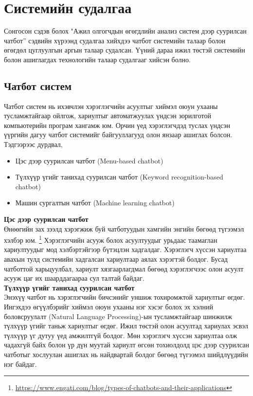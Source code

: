 \section{Системийн судалгаа}
Сонгосон сэдэв болох "Ажил олгогчдын өгөгдлийн анализ систем дээр суурилсан чатбот” сэдвийн хүрээнд судалгаа хийхдээ чатбот системийн талаар болон өгөгдөл цуглуулгын аргын талаар судалсан. Үүний дараа ижил төстэй системийн болон ашиглагдах технологийн талаар судалгааг хийсэн болно.
\subsection{Чатбот систем}
Чатбот систем нь ихэвчлэн хэрэглэгчийн асуултыг хиймэл оюун ухааны тусламжтайгаар ойлгож, хариултыг автоматжуулах үндсэн зорилготой компьютерийн програм хангамж юм. Орчин үед хэрэглэгчдэд туслах үндсэн үүргийн дагуу чатбот системийг байгууллагууд олон янзаар ашиглах болсон. Тэдгээрээс дурдвал,
\begin{itemize}
  \item Цэс дээр суурилсан чатбот (Menu-based chatbot)
  \item Түлхүүр үгийг танихад суурилсан чатбот (Keyword recognition-based chatbot)
  \item Машин сургалтын чатбот (Machine learning chatbot)
\end{itemize}
\textbf{Цэс дээр суурилсан чатбот}
\\Өнөөгийн зах зээлд хэрэгжиж буй чатботуудын хамгийн энгийн бөгөөд түгээмэл хэлбэр юм.\cite{chatbotsystem} \footnote{\url{https://www.engati.com/blog/types-of-chatbots-and-their-applications}} Хэрэглэгчийн асууж болох асуултуудыг урьдаас таамаглан хариултуудыг мод хэлбэртэйгээр бүтэцлэн хадгалдаг. Хэрэглэгч хүссэн хариултаа авахын тулд системийн хадгалсан хариултаар аялах хэрэгтэй болдог. Бусад чатботтой харьцуулбал, хариулт хязгаарлагдмал бөгөөд хэрэглэгчээс олон асуулт асууж цаг их шаарддагаараа сул талтай байдаг. 
\\
\textbf{Түлхүүр үгийг танихад суурилсан чатбот}
\\Энэхүү чатбот нь хэрэглэгчийн бичсэнийг уншиж тохиромжтой хариултыг өгдөг. Ингэхдээ өгүүлбэрийг хиймэл оюун ухааны нэг хэсэг болох эх хэлний боловсруулалт (Natural Language Processing)-ын тусламжтайгаар шинжилж түлхүүр үгийг таньж хариултыг өгдөг. Ижил төстэй олон асуултад хариулах эсвэл түлхүүр үг дутуу үед амжилтгүй болдог. Мөн хэрэглэгч хүссэн хариултаа олж чадахгүй байх болон үр дүн муутай хариулт өгсөн тохиолдолд цэс дээр суурилсан чатботыг хослуулан ашиглах нь найдвартай болдог бөгөөд түгээмэл шийдлүүдийн нэг байдаг. 
